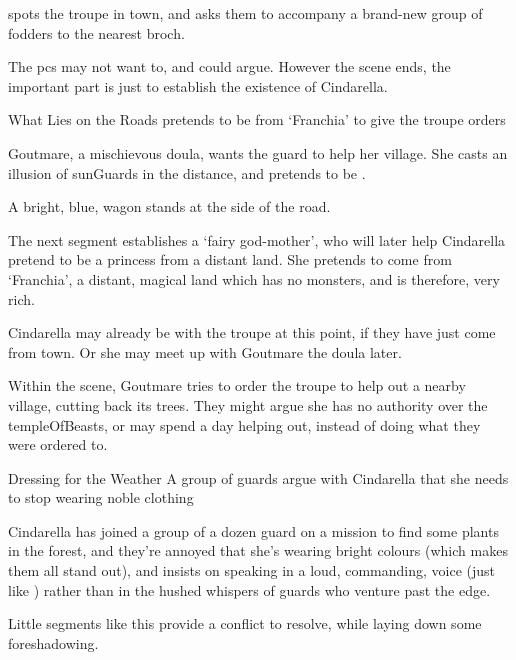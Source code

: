\begin{multicols}{2}
 spots the troupe in town, and asks them to accompany a brand-new group of \glspl{fodder} to the nearest \gls{broch}.

The \glspl{pc} may not want to, and could argue.
However the scene ends, the important part is just to establish the existence of Cindarella.

{What Lies on the Roads}%
{ pretends to be  from `Franchia' to give the troupe orders}%

\begin{exampletext}
  Goutmare, a mischievous \gls{doula}, wants the \gls{guard} to help her \gls{village}.
  She casts an illusion of \glspl{sunGuard} in the distance, and pretends to be .
\end{exampletext}

\begin{boxtext}
  A bright, blue, wagon stands at the side of the road.
\end{boxtext}

The next \gls{segment} establishes a `fairy god-mother', who will later help Cindarella pretend to be a princess from a distant land.
She pretends to come from `Franchia', a distant, magical land which has no monsters, and is therefore, very rich.

Cindarella may already be with the troupe at this point, if they have just come from town.
Or she may meet up with Goutmare the \gls{doula} later.

Within the scene, Goutmare tries to order the troupe to help out a nearby \gls{village}, cutting back its trees.
They might argue she has no authority over the \gls{templeOfBeasts}, or may spend a day helping out, instead of doing what they were ordered to.

{Dressing for the Weather}%
{A group of \glspl{guard} argue with Cindarella that she needs to stop wearing noble clothing}%

\begin{exampletext}
  Cindarella has joined a group of a dozen \gls{guard} on a mission to find some plants in the forest, and they're annoyed that she's wearing bright colours (which makes them all stand out), and insists on speaking in a loud, commanding, voice (just like ) rather than in the hushed whispers of \glspl{guard} who venture past the \gls{edge}.
\end{exampletext}

Little \glspl{segment} like this provide a conflict to resolve, while laying down some foreshadowing.


\end{multicols}
